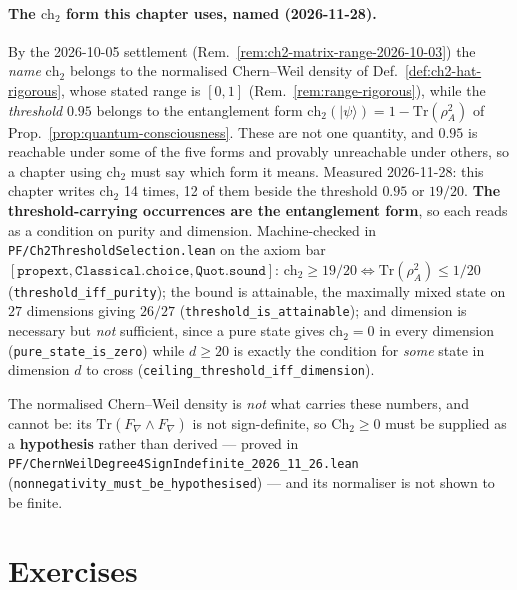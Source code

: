 \paragraph{The $\text{ch}_2$ form this chapter uses, named (2026-11-28).}
By the 2026-10-05 settlement (Rem.~\ref{rem:ch2-matrix-range-2026-10-03}) the
\emph{name} $\text{ch}_2$ belongs to the normalised Chern--Weil density of
Def.~\ref{def:ch2-hat-rigorous}, whose stated range is $[0,1]$
(Rem.~\ref{rem:range-rigorous}), while the \emph{threshold} $0.95$ belongs to the
entanglement form $\text{ch}_2(|\psi\rangle) = 1 - \mathrm{Tr}(\rho_A^2)$ of
Prop.~\ref{prop:quantum-consciousness}. These are not one quantity, and $0.95$ is
reachable under some of the five forms and provably unreachable under others, so a
chapter using $\text{ch}_2$ must say which form it means.
Measured 2026-11-28: this chapter writes $\text{ch}_2$ 14 times, 12 of them
beside the threshold $0.95$ or $19/20$. \textbf{The threshold-carrying occurrences
are the entanglement form}, so each reads as a condition on purity and dimension.
Machine-checked in \texttt{PF/Ch2ThresholdSelection.lean} on the axiom bar
$[\mathtt{propext}, \mathtt{Classical.choice}, \mathtt{Quot.sound}]$:
$\text{ch}_2 \geq 19/20 \iff \mathrm{Tr}(\rho_A^2) \leq 1/20$
(\texttt{threshold\_iff\_purity}); the bound is attainable, the maximally mixed
state on $27$ dimensions giving $26/27$ (\texttt{threshold\_is\_attainable}); and
dimension is necessary but \emph{not} sufficient, since a pure state gives
$\text{ch}_2 = 0$ in every dimension (\texttt{pure\_state\_is\_zero}) while
$d \geq 20$ is exactly the condition for \emph{some} state in dimension $d$ to
cross (\texttt{ceiling\_threshold\_iff\_dimension}).

\noindent The normalised Chern--Weil density is \emph{not} what carries these
numbers, and cannot be: its $\mathrm{Tr}(F_\nabla \wedge F_\nabla)$ is not
sign-definite, so $\mathrm{Ch}_2 \geq 0$ must be supplied as a \textbf{hypothesis}
rather than derived --- proved in
\texttt{PF/ChernWeilDegree4SignIndefinite\_2026\_11\_26.lean}
(\texttt{nonnegativity\_must\_be\_hypothesised}) --- and its normaliser is not
shown to be finite.


\section*{Exercises}

